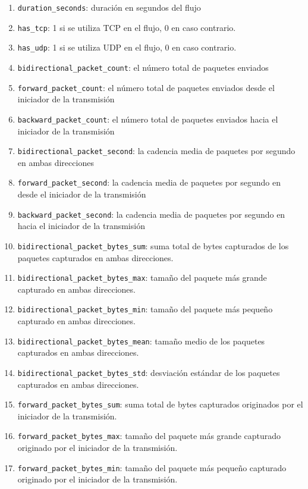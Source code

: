 \begin{enumerate}
  \item \texttt{duration\_seconds}: duración en segundos del flujo
  \item \texttt{has\_tcp}: 1 si se utiliza TCP en el flujo, 0 en caso contrario.
  \item \texttt{has\_udp}: 1 si se utiliza UDP en el flujo, 0 en caso contrario.
  \item \texttt{bidirectional\_packet\_count}: el número total de paquetes enviados
  \item \texttt{forward\_packet\_count}: el número total de paquetes enviados desde el iniciador de la transmisión
  \item \texttt{backward\_packet\_count}: el número total de paquetes enviados hacia el iniciador de la transmisión
  \item \texttt{bidirectional\_packet\_second}: la cadencia media de paquetes por segundo en ambas direcciones
  \item \texttt{forward\_packet\_second}: la cadencia media de paquetes por segundo en desde el iniciador de la transmisión
  \item \texttt{backward\_packet\_second}: la cadencia media de paquetes por segundo en hacia el iniciador de la transmisión
  \item \texttt{bidirectional\_packet\_bytes\_sum}: suma total de bytes capturados de los paquetes capturados en ambas direcciones.
  \item \texttt{bidirectional\_packet\_bytes\_max}: tamaño del paquete más grande capturado en ambas direcciones.
  \item \texttt{bidirectional\_packet\_bytes\_min}: tamaño del paquete más pequeño capturado en ambas direcciones.
  \item \texttt{bidirectional\_packet\_bytes\_mean}: tamaño medio de los paquetes capturados en ambas direcciones.
  \item \texttt{bidirectional\_packet\_bytes\_std}: desviación estándar de los paquetes capturados en ambas direcciones.
  \item \texttt{forward\_packet\_bytes\_sum}: suma total de bytes capturados originados por el iniciador de la transmisión.
  \item \texttt{forward\_packet\_bytes\_max}: tamaño del paquete más grande capturado originado por el iniciador de la transmisión.
  \item \texttt{forward\_packet\_bytes\_min}: tamaño del paquete más pequeño capturado originado por el iniciador de la transmisión.

\end{enumerate}
